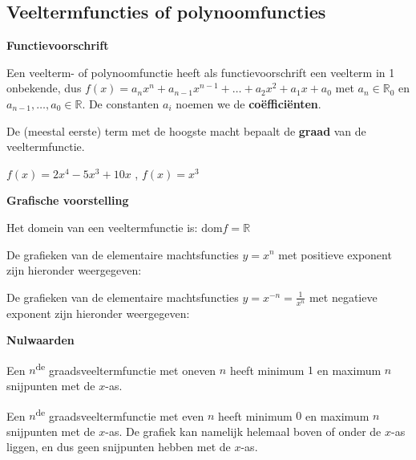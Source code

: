 \subsection{Veeltermfuncties of polynoomfuncties}
\label{sec:vtf}

\textbf{Functievoorschrift}

\begin{definitie}
	Een veelterm- of polynoomfunctie heeft als functievoorschrift een veelterm in 1 onbekende, dus
$f(x)=a_{n}x^{n}+a_{n-1}x^{n-1}+\ldots+a_{2}x^{2}+a_{1}x+a_{0}$
met $a_{n}\in\mathbb{R}_{0}$ en $a_{n-1},\ldots,a_{0}\in\mathbb{R}$. De constanten $a_{i}$ noemen we de \textbf{co\"effici\"enten}.

\end{definitie}

De (meestal eerste) term met de hoogste macht bepaalt de \textbf{graad} van de veeltermfunctie.

\begin{voorbeeld}
	$f(x)=2x^{4}-5x^{3}+10x$ , $f(x)=x^{3}$ 
\end{voorbeeld}

\textbf{Grafische voorstelling}

Het domein van een veeltermfunctie is: $\textrm{dom}f=\mathbb{R}$

De grafieken van de elementaire machtsfuncties $y=x^{n}$
met positieve exponent zijn hieronder weergegeven:



De grafieken van de elementaire machtsfuncties $y=x^{-n}=\frac{1}{x^{n}}$
met negatieve exponent zijn hieronder weergegeven:




\textbf{Nulwaarden}

 Een $n$\textsuperscript{de} graadsveeltermfunctie met oneven
$n$ heeft minimum $1$ en maximum $n$ snijpunten met de $x$-as.

 Een $n$\textsuperscript{de} graadsveeltermfunctie met even
$n$ heeft minimum $0$ en maximum $n$ snijpunten met de $x$-as. De grafiek
kan namelijk helemaal boven of onder de $x$-as liggen, en dus geen
snijpunten hebben met de $x$-as.



